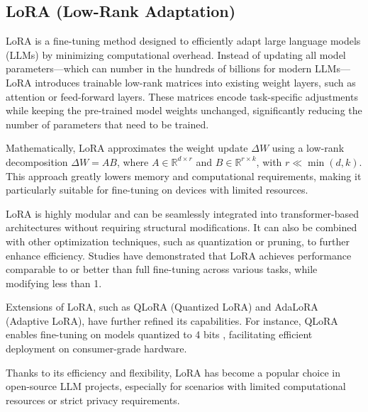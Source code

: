 

\subsection{LoRA (Low-Rank Adaptation)}     %


LoRA \cite{Hu2021LoRA} is a fine-tuning method designed to efficiently adapt large language models (LLMs) by minimizing computational overhead. Instead of updating all model parameters—which can number in the hundreds of billions for modern LLMs—LoRA introduces trainable low-rank matrices into existing weight layers, such as attention or feed-forward layers. These matrices encode task-specific adjustments while keeping the pre-trained model weights unchanged, significantly reducing the number of parameters that need to be trained.

Mathematically, LoRA approximates the weight update $\Delta W$ using a low-rank decomposition $\Delta W = A B$, where $A \in \mathbb{R}^{d \times r}$ and $B \in \mathbb{R}^{r \times k}$, with $r \ll \min(d,k)$. This approach greatly lowers memory and computational requirements, making it particularly suitable for fine-tuning on devices with limited resources.

LoRA is highly modular and can be seamlessly integrated into transformer-based architectures without requiring structural modifications. It can also be combined with other optimization techniques, such as quantization or pruning, to further enhance efficiency. Studies have demonstrated that LoRA achieves performance comparable to or better than full fine-tuning across various tasks, while modifying less than 1.%

Extensions of LoRA, such as QLoRA (Quantized LoRA) and AdaLoRA (Adaptive LoRA), have further refined its capabilities. For instance, QLoRA enables fine-tuning on models quantized to 4 bits \cite{Dettmers2023QLoRA}, facilitating efficient deployment on consumer-grade hardware.

Thanks to its efficiency and flexibility, LoRA has become a popular choice in open-source LLM projects, especially for scenarios with limited computational resources or strict privacy requirements.


